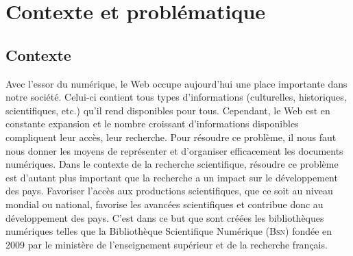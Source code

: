   \chapter{Contexte et problématique}
    \section{Contexte}
      Avec l'essor du numérique, le Web occupe aujourd'hui une place importante
      dans notre société. Celui-ci contient tous types d'informations
      (culturelles, historiques, scientifiques, etc.) qu'il rend disponibles
      pour tous. Cependant, le Web est en constante expansion et le nombre
      croissant d'informations disponibles compliquent leur accès, leur
      recherche. Pour résoudre ce problème, il nous faut nous donner les moyens
      de représenter et d'organiser efficacement les documents numériques. Dans
      le contexte de la recherche scientifique, résoudre ce problème est
      d'autant plus important que la recherche a un impact sur le développement
      des pays. Favoriser l'accès aux productions scientifiques, que ce soit au
      niveau mondial ou national, favorise les avancées scientifiques et
      contribue donc au développement des pays. C'est dans ce but que sont
      créées les bibliothèques numériques telles que la Bibliothèque
      Scientifique Numérique (\textsc{Bsn}) fondée en 2009 par le ministère de
      l'enseignement supérieur et de la recherche français.

